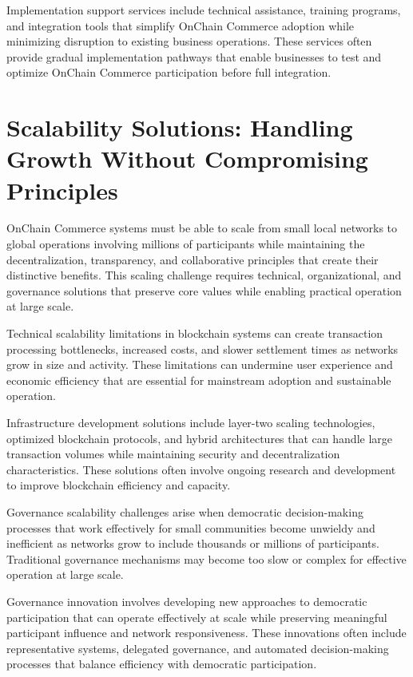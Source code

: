 \documentclass[
  Letterpaper,
]{scrbook}
\begin{document}
Implementation support services include technical assistance, training
programs, and integration tools that simplify OnChain Commerce adoption
while minimizing disruption to existing business operations. These
services often provide gradual implementation pathways that enable
businesses to test and optimize OnChain Commerce participation before
full integration.

\section{Scalability Solutions: Handling Growth Without Compromising
Principles}\label{scalability-solutions-handling-growth-without-compromising-principles}

OnChain Commerce systems must be able to scale from small local networks
to global operations involving millions of participants while
maintaining the decentralization, transparency, and collaborative
principles that create their distinctive benefits. This scaling
challenge requires technical, organizational, and governance solutions
that preserve core values while enabling practical operation at large
scale.

Technical scalability limitations in blockchain systems can create
transaction processing bottlenecks, increased costs, and slower
settlement times as networks grow in size and activity. These
limitations can undermine user experience and economic efficiency that
are essential for mainstream adoption and sustainable operation.

Infrastructure development solutions include layer-two scaling
technologies, optimized blockchain protocols, and hybrid architectures
that can handle large transaction volumes while maintaining security and
decentralization characteristics. These solutions often involve ongoing
research and development to improve blockchain efficiency and capacity.

Governance scalability challenges arise when democratic decision-making
processes that work effectively for small communities become unwieldy
and inefficient as networks grow to include thousands or millions of
participants. Traditional governance mechanisms may become too slow or
complex for effective operation at large scale.

Governance innovation involves developing new approaches to democratic
participation that can operate effectively at scale while preserving
meaningful participant influence and network responsiveness. These
innovations often include representative systems, delegated governance,
and automated decision-making processes that balance efficiency with
democratic participation.
\end{document}
